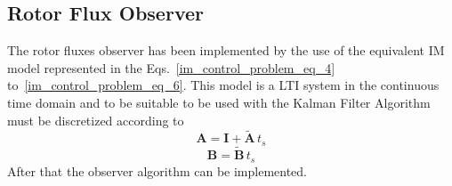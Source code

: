 \documentclass[11pt,a4paper,oneside]{book}
\numberwithin{equation}{section}
\theoremstyle{it}
\theoremstyle{definition}
\begin{document}
\subsection{Rotor Flux Observer}
The rotor fluxes observer has been implemented by the use of the equivalent IM 
model represented in the Eqs.~\eqref{im_control_problem_eq_4} 
to~\eqref{im_control_problem_eq_6}. This model is a LTI system in the 
continuous time domain and to be suitable to be used with the Kalman Filter 
Algorithm must be discretized according to 
\begin{equation}\label{im_control_problem_eq_7}
	\mathbf{A} = \mathbf{I} + \tilde{\mathbf{A}} \,t_s
\end{equation}
\begin{equation}\label{im_control_problem_eq_8}
	\mathbf{B} = \tilde{\mathbf{B}} \,t_s
\end{equation}
After that the observer algorithm can be implemented.
\end{document}
